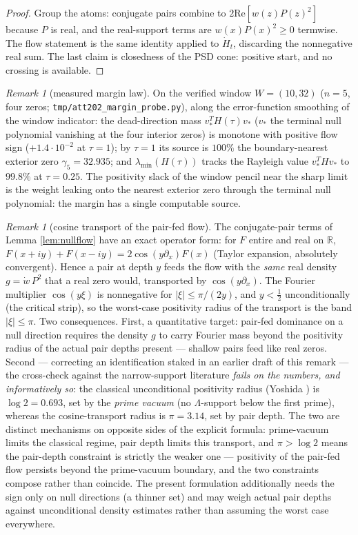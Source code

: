 \documentclass[11pt]{article}
\theoremstyle{plain}
\theoremstyle{definition}
\theoremstyle{remark}
\newtheorem{remark}[theorem]{Remark}
\newcommand{\R}{\mathbb{R}}
\begin{document}
\begin{proof}
Group the atoms: conjugate pairs combine to $2\mathrm{Re}[w(z)P(z)^{2}]$ because $P$
is real, and the real-support terms are $w(x)P(x)^2\ge0$ termwise. The flow statement
is the same identity applied to $\dot H_t$, discarding the nonnegative real sum. The
last claim is closedness of the PSD cone: positive start, and no crossing is
available.
\end{proof}

\begin{remark}[measured margin law]
On the verified window $W=(10,32)$ ($n=5$, four zeros;
\texttt{tmp/att202\_margin\_probe.py}), along the error-function smoothing of the
window indicator: the dead-direction mass $v_*^{T}H(\tau)v_*$ ($v_*$ the terminal null
polynomial vanishing at the four interior zeros) is monotone with positive flow sign
($+1.4\cdot10^{-2}$ at $\tau=1$); by $\tau=1$ its source is $100\%$ the
boundary-nearest exterior zero $\gamma_5=32.935$; and $\lambda_{\min}(H(\tau))$ tracks
the Rayleigh value $v_*^{T}Hv_*$ to $99.8\%$ at $\tau=0.25$. The positivity slack of
the window pencil near the sharp limit is the weight leaking onto the nearest exterior
zero through the terminal null polynomial: the margin has a single computable source.
\end{remark}

\begin{remark}[cosine transport of the pair-fed flow]\label{rem:cosine}
The conjugate-pair terms of Lemma \ref{lem:nullflow} have an exact operator form: for
$F$ entire and real on $\R$, $F(x+iy)+F(x-iy)=2\cos(y\partial_x)F(x)$ (Taylor
expansion, absolutely convergent). Hence a pair at depth $y$ feeds the flow with the
\emph{same} real density $g=\dot w\,P^2$ that a real zero would, transported by
$\cos(y\partial_x)$. The Fourier multiplier $\cos(y\xi)$ is nonnegative for
$|\xi|\le\pi/(2y)$, and $y<\tfrac12$ unconditionally (the critical strip), so the
worst-case positivity radius of the transport is the band $|\xi|\le\pi$. Two
consequences. First, a quantitative target: pair-fed dominance on a null direction
requires the density $g$ to carry Fourier mass beyond the positivity radius of the
actual pair depths present --- shallow pairs feed like real zeros. Second --- correcting an identification staked in an earlier draft of this remark ---
the cross-check against the narrow-support literature \emph{fails on the numbers, and
informatively so}: the classical unconditional positivity radius (Yoshida
\cite{Yoshida1992}) is
$\log2=0.693$, set by the \emph{prime vacuum} (no $\Lambda$-support below the first
prime), whereas the cosine-transport radius is $\pi=3.14$, set by pair depth. The two
are distinct mechanisms on opposite sides of the explicit formula: prime-vacuum limits
the classical regime, pair depth limits this transport, and $\pi>\log2$ means the
pair-depth constraint is strictly the weaker one --- positivity of the pair-fed flow
persists beyond the prime-vacuum boundary, and the two constraints compose rather
than coincide. The present formulation additionally needs the sign only on null
directions (a thinner set) and may weigh actual pair depths against unconditional
density estimates rather than assuming the worst case everywhere.
\end{remark}
\end{document}
